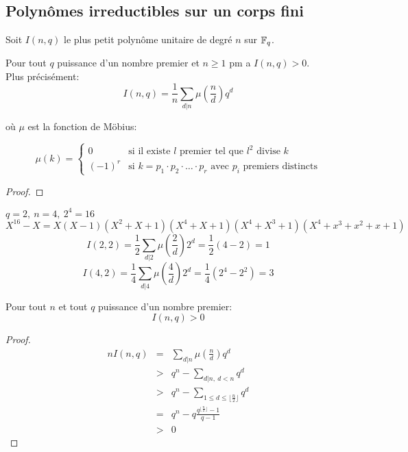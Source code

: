 \subsection{Polynômes irreductibles sur un corps fini}


Soit $I(n,q)$ le plus petit polynôme unitaire de degré $n$ sur $\mathbb{F}_q$.

\begin{theorem}
	Pour tout $q$ puissance d'un nombre premier et $n \geq 1$ pm a $I(n,q) > 0$.\\

	Plus précisément:
	$$ I(n,q) = \frac{1}{n} \sum_{d|n} \mu(\frac{n}{d}) q^d$$

	où $\mu$ est la fonction de Möbius:

	\[ \mu(k) = \left\{\begin{array}{ll}
			0      & \text{si il existe } l \text{ premier tel que } l^2 \text{ divise } k                            \\
			(-1)^r & \text{si } k = p_1 \cdot p_2 \cdot \ldots \cdot p_r \text{ avec } p_i \text{ premiers distincts}
		\end{array} \right.\]

\end{theorem}

\begin{proof}
\end{proof}

\begin{example}
	$ q = 2, \ n = 4, \ 2^4 = 16 $
	$$	X ^16 - X = X(X-1)(X^2 + X + 1)(X^4 + X + 1)(X^4 + X^3 + 1)(X^4 + x^3 + x^2 + x + 1) $$
	$$	I(2,2) = \frac{1}{2}\sum_{d|2} \mu(\frac{2}{d}) 2^d = \frac{1}{2}(4-2) = 1$$
	$$	I(4,2) = \frac{1}{4}\sum_{d|4} \mu(\frac{4}{d}) 2^d = \frac{1}{4}(2^4 - 2^2) = 3$$
\end{example}


\begin{coro}
	Pour tout $n$ et tout $q$ puissance d'un nombre premier:
	$$ I (n, q) > 0 $$
\end{coro}


\begin{proof}
	\begin{eqnarray*}
		n I(n, q) & = & \sum_{d|n} \mu(\frac{n}{d}) q^d \\
		&>& q^n - \sum_{d|n,\ d < n} q^d \\
		&>& q^n - \sum_{1 \leq d\leq \lfloor \frac n 2 \rfloor} q^d \\
		&=& q^n - q\frac{q^{\lfloor \frac n 2 \rfloor} - 1}{q-1} \\
		&>& 0
	\end{eqnarray*}
\end{proof}

